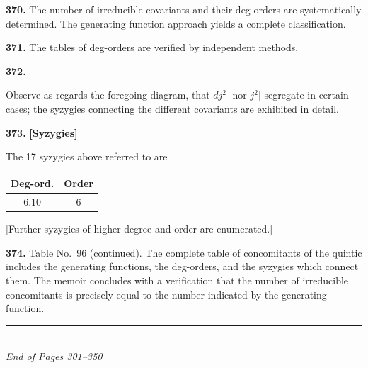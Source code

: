 \documentclass[12pt,a4paper]{article}
\theoremstyle{definition}
\begin{document}
\medskip
\noindent\textbf{370.}\quad
The number of irreducible covariants and their deg-orders are systematically determined. The generating function approach yields a complete classification.

\medskip
\noindent\textbf{371.}\quad
The tables of deg-orders are verified by independent methods.

\medskip
\noindent\textbf{372.}

Observe as regards the foregoing diagram, that $dj^2$ [nor $j^2$] segregate in certain cases; the syzygies connecting the different covariants are exhibited in detail.

\medskip
\noindent\textbf{373.}\quad
\textbf{[Syzygies]}

The 17 syzygies above referred to are

\begin{center}
\begin{tabular}{|c|c|}
\hline
Deg-ord. & Order \\
\hline
6.10 & 6 \\
\hline
\end{tabular}
\end{center}

[Further syzygies of higher degree and order are enumerated.]

\medskip
\noindent\textbf{374.}\quad
Table No.\ 96 (continued). The complete table of concomitants of the quintic includes the generating functions, the deg-orders, and the syzygies which connect them. The memoir concludes with a verification that the number of irreducible concomitants is precisely equal to the number indicated by the generating function.

\vspace{2em}
\begin{center}
\rule{0.5\textwidth}{0.4pt}\\[1em]
\textit{End of Pages 301--350}
\end{center}
\end{document}

